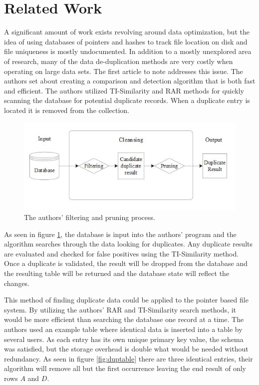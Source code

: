\documentclass[11pt]{article}
\begin{document}
\vspace*{-.1in}
\section{Related Work}
\label{sec:relatedwork}
\vspace*{-.1in}

A significant amount of work exists revolving around data optimization, but the idea of using databases of pointers and hashes to track file location on disk and file uniqueness is mostly undocumented. In addition to a mostly unexplored area of research, many of the data de-duplication methods are very costly when operating on large data sets. The first article to note addresses this issue. The authors set about creating a comparison and detection algorithm that is both fast and efficient. The authors utilized TI-Similarity and RAR methods for quickly scanning the database for potential duplicate records. \cite{Sung} When a duplicate entry is located it is removed from the collection.

\begin{figure}
\begin{center}
\includegraphics[scale=.8]{duplicate}
\caption{\label{fig:duplicate} The authors' filtering and pruning process.}
\end{center}
\end{figure}

As seen in figure \ref{fig:duplicate}, the database is input into the authors' program and the algorithm searches through the data looking for duplicates. Any duplicate results are evaluated and checked for false positives using the TI-Similarity method. \cite{Sung} Once a duplicate is validated, the result will be dropped from the database  and the resulting table will be returned and the database state will reflect the changes.

This method of finding duplicate data could be applied to the pointer based file system. By utilizing the authors' RAR and TI-Similarity search methods, it would be more efficient than searching the database one record at a time. The authors used an example table where identical data is inserted into a table by several users. As each entry has its own unique primary key value, the schema was satisfied, but the storage overhead is double what would be needed without redundancy. As seen in figure \ref{fig:duptable} there are three identical entries, their algorithm will remove all but the first occurrence leaving the end result of only rows $A$ and $D$.
\end{document}
